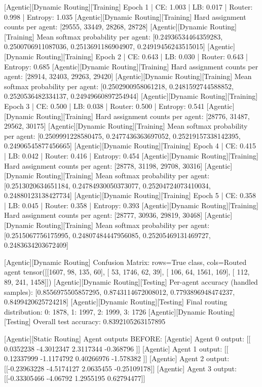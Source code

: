 [Agentic][Dynamic Routing][Training] Epoch 1 | CE: 1.003 | LB: 0.017 | Router: 0.998 | Entropy: 1.035
[Agentic][Dynamic Routing][Training] Hard assignment counts per agent: [29555, 33449, 28268, 28728]
[Agentic][Dynamic Routing][Training] Mean softmax probability per agent: [0.24936534464359283, 0.2500706911087036, 0.2513691186904907, 0.24919456243515015]
[Agentic][Dynamic Routing][Training] Epoch 2 | CE: 0.643 | LB: 0.030 | Router: 0.643 | Entropy: 0.685
[Agentic][Dynamic Routing][Training] Hard assignment counts per agent: [28914, 32403, 29263, 29420]
[Agentic][Dynamic Routing][Training] Mean softmax probability per agent: [0.2502900958061218, 0.2481592744588852, 0.2520536482334137, 0.24949660897254944]
[Agentic][Dynamic Routing][Training] Epoch 3 | CE: 0.500 | LB: 0.038 | Router: 0.500 | Entropy: 0.541
[Agentic][Dynamic Routing][Training] Hard assignment counts per agent: [28776, 31487, 29562, 30175]
[Agentic][Dynamic Routing][Training] Mean softmax probability per agent: [0.2509991228580475, 0.2477436363697052, 0.25219157338142395, 0.24906545877456665]
[Agentic][Dynamic Routing][Training] Epoch 4 | CE: 0.415 | LB: 0.042 | Router: 0.416 | Entropy: 0.454
[Agentic][Dynamic Routing][Training] Hard assignment counts per agent: [28778, 31198, 29708, 30316]
[Agentic][Dynamic Routing][Training] Mean softmax probability per agent: [0.2513020634651184, 0.24784930050373077, 0.25204724073410034, 0.24880123138427734]
[Agentic][Dynamic Routing][Training] Epoch 5 | CE: 0.358 | LB: 0.045 | Router: 0.358 | Entropy: 0.393
[Agentic][Dynamic Routing][Training] Hard assignment counts per agent: [28777, 30936, 29819, 30468]
[Agentic][Dynamic Routing][Training] Mean softmax probability per agent: [0.2515067756175995, 0.24807484447956085, 0.25205469131469727, 0.2483634203672409]

[Agentic][Dynamic Routing] Confusion Matrix: rows=True class, cols=Routed agent
tensor([[1607,   98,  135,   60],
[  53, 1746,   62,   39],
[ 106,   64, 1561,  169],
[ 112,   89,  241, 1458]])
[Agentic][Dynamic Routing][Testing] Per-agent accuracy (handled samples): [0.8556975505857295, 0.8743114672008012, 0.7793896948474237, 0.8499420625724218]
[Agentic][Dynamic Routing][Testing] Final routing distribution: {0: 1878, 1: 1997, 2: 1999, 3: 1726}
[Agentic][Dynamic Routing][Testing] Overall test accuracy: 0.8392105263157895

[Agentic][Static Routing] Agent outputs BEFORE:
[Agentic] Agent 0 output: [[ 0.0352238 -4.3012347  2.3117344 -0.368796 ]]
[Agentic] Agent 1 output: [[ 0.12337999 -1.1174792   0.40266976 -1.578382  ]]
[Agentic] Agent 2 output: [[-0.23963228 -4.5174127   2.0635455  -0.25109178]]
[Agentic] Agent 3 output: [[-0.33305466 -4.06792     1.2955195   0.62794477]]

